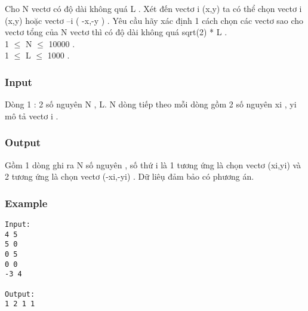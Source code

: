 



   Cho N vectơ có độ dài không quá L . Xét đến vectơ i (x,y) ta có thể chọn vectơ i (x,y) hoặc vectơ –i ( -x,-y ) . Yêu cầu hãy xác định 1 cách chọn các vectơ sao cho vectơ tổng của N vectơ thì có độ dài không quá sqrt(2) * L .   
\\   1  $\le$  N  $\le$  10000 .   
\\   1  $\le$  L  $\le$  1000 .   
\\

\subsubsection{   Input  }

   Dòng 1 : 2 số nguyên N , L. N dòng tiếp theo mỗi dòng gồm 2 số nguyên xi , yi mô tả vectơ i .  

\subsubsection{   Output  }

   Gồm 1 dòng ghi ra N số nguyên , số thứ i là 1 tương ứng là chọn vectơ (xi,yi) và 2 tương ứng là chọn vectơ (-xi,-yi) . Dữ liêụ đảm bảo có phương án.  

\subsubsection{   Example  }
\begin{verbatim}
Input:
4 5
5 0
0 5
0 0
-3 4

Output:
1 2 1 1
\end{verbatim}

